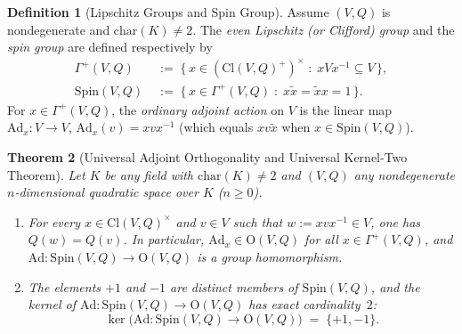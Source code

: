\documentclass[11pt]{article}
\newtheorem{theorem}{Theorem}[section]
\theoremstyle{definition}
\newtheorem{definition}[theorem]{Definition}
\theoremstyle{remark}
\newcommand{\Cl}{\mathrm{Cl}}
\newcommand{\Spin}{\mathrm{Spin}}
\newcommand{\Ad}{\mathrm{Ad}}
\newcommand{\Orth}{\mathrm{O}}
\begin{document}
\begin{definition}[Lipschitz Groups and Spin Group]\label{def:spin}
Assume $(V,Q)$ is nondegenerate and $\mathrm{char}(K) \ne 2$. The \emph{even Lipschitz (or Clifford) group} and the \emph{spin group} are defined respectively by
\begin{align*}
\Gamma^+(V,Q) &\;:=\; \bigl\{\, x \in (\Cl(V,Q)^+)^\times \;:\; x V x^{-1} \subseteq V \,\bigr\}, \\
\Spin(V,Q) &\;:=\; \bigl\{\, x \in \Gamma^+(V,Q) \;:\; x \widetilde{x} = \widetilde{x} x = 1 \,\bigr\}.
\end{align*}
For $x \in \Gamma^+(V,Q)$, the \emph{ordinary adjoint action} on $V$ is the linear map $\Ad_x : V \to V$, $\Ad_x(v) = x v x^{-1}$ (which equals $x v \widetilde{x}$ when $x \in \Spin(V,Q)$).
\end{definition}

\begin{theorem}[Universal Adjoint Orthogonality and Universal Kernel-Two Theorem]\label{thm:universal-kernel-two}
Let $K$ be any field with $\mathrm{char}(K) \ne 2$ and $(V,Q)$ any nondegenerate $n$-dimensional quadratic space over $K$ ($n \ge 0$).
\begin{enumerate}
\item[(a)] For every $x \in \Cl(V,Q)^\times$ and $v \in V$ such that $w := x v x^{-1} \in V$, one has $Q(w) = Q(v)$. In particular, $\Ad_x \in \Orth(V,Q)$ for all $x \in \Gamma^+(V,Q)$, and $\Ad : \Spin(V,Q) \to \Orth(V,Q)$ is a group homomorphism.
\item[(b)] The elements $+1$ and $-1$ are distinct members of $\Spin(V,Q)$, and the kernel of $\Ad : \Spin(V,Q) \to \Orth(V,Q)$ has exact cardinality~$2$:
\[
\ker\bigl(\Ad : \Spin(V,Q) \to \Orth(V,Q)\bigr) \;=\; \{+1, -1\}.
\]
\end{enumerate}
\end{theorem}
\end{document}
